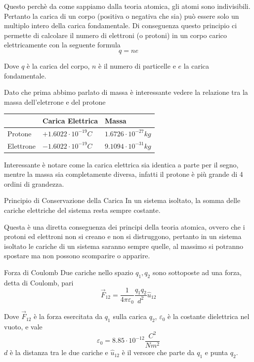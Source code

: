 \documentclass{rapport}
\begin{document}
Questo perchè da come sappiamo dalla teoria atomica, gli atomi sono indivisibili. Pertanto la carica di un corpo (positiva o negativa che sia) può essere solo un multiplo intero della carica fondamentale. Di conseguenza questo principio ci permette di calcolare il numero di elettroni (o protoni) in un corpo carico elettricamente con la seguente formula 
\[
q = ne
\]

Dove $q$ è la carica del corpo, $n$ è il numero di particelle e $e$ la carica fondamentale. 

Dato che prima abbimo parlato di massa è interessante vedere la relazione tra la massa dell'eletrrone e del protone

\begin{table}[!h]
  \centering
\begin{tabular}{l|l|l}
          & Carica Elettrica                                           & Massa          \\ \hline
Protone   & $+1.6022 \cdot 10^{-19} C$ & $1.6726 \cdot 10^{-27} kg$ \\ \hline
Elettrone & $-1.6022 \cdot 10^{-19} C$ & $9.1094 \cdot 10^{-31} kg$
\end{tabular}
\end{table}



Interessante è notare come la carica elettrica sia identica a parte per il segno, mentre la massa sia completamente diversa, infatti il protone è più grande di 4 ordini di grandezza. 



\newpage

\begin{proposizione}{Principio di Conservazione della Carica}{}
  In un sistema isoltato, la somma delle cariche elettriche del sistema resta sempre costante.
\end{proposizione}

Questa è una diretta conseguenza dei principi della teoria atomica, ovvero che i protoni ed elettroni non si creano e non si distruggono, pertanto in un sistema isoltato le cariche di un sistema saranno sempre quelle, al massimo si potranno spostare ma non possono scomparire o apparire.

\begin{definizione}{Forza di Coulomb}{}
  Due cariche nello spazio $q_1, q_2$ sono sottoposte ad una forza, detta di Coulomb,  pari  
  \[
  \vec{F}_{12} = \dfrac{1}{4\pi \varepsilon_0} \dfrac{q_1q_2}{d^2} \hat{u}_{12}
  \]

  Dove $\vec{F}_{12}$ è la forza esercitata da $q_1$ sulla carica $q_2$, $\varepsilon_0$ è la costante dielettrica nel vuoto, e vale 
  \[\varepsilon_0=8.85\cdot 10^{-12} \dfrac{C^2}{Nm^2}\]
  $d$ è la distanza tra le due cariche e $\hat{u}_{12}$ è il versore che parte da $q_1$ e punta $q_2$.
\end{definizione}
\end{document}
